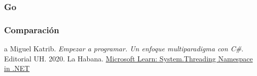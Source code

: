 \documentclass[10pt]{article} %
\begin{document}
\subsubsection{Go}

\subsubsection{Comparaci\'on}

\begin{thebibliography}
	a
	 Miguel Katrib. \emph{Empezar a programar. Un enfoque multiparadigma con C\#}. 
	Editorial UH.
	2020.
	La Habana.
	 \href{https://learn.microsoft.com/en-us/dotnet/api/system.threading?view=net-7.0}{Microsoft Learn: System.Threading Namespace in .NET}
\end{thebibliography}
\end{document}
